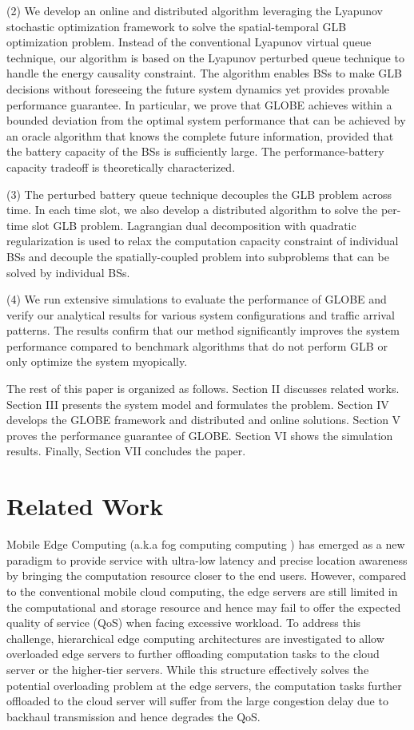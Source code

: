 \documentclass[12pt, draftclsnofoot, letterpaper, onecolumn]{IEEEtran}
\begin{document}
(2) We develop an online and distributed algorithm leveraging the Lyapunov stochastic optimization framework to solve the spatial-temporal GLB optimization problem. Instead of the conventional Lyapunov virtual queue technique, our algorithm is based on the Lyapunov perturbed queue technique to handle the energy causality constraint. The algorithm enables BSs to make GLB decisions without foreseeing the future system dynamics yet provides provable performance guarantee. In particular, we prove that GLOBE achieves within a bounded deviation from the optimal system performance that can be achieved by an oracle algorithm that knows the complete future information, provided that the battery capacity of the BSs is sufficiently large. The performance-battery capacity tradeoff is theoretically characterized.

(3) The perturbed battery queue technique decouples the GLB problem across time. In each time slot, we also develop a distributed algorithm to solve the per-time slot GLB problem. Lagrangian dual decomposition with quadratic regularization is used to relax the computation capacity constraint of individual BSs and decouple the spatially-coupled problem into subproblems that can be solved by individual BSs.

(4) We run extensive simulations to evaluate the performance of GLOBE and verify our analytical results for various system configurations and traffic arrival patterns. The results confirm that our method significantly improves the system performance compared to benchmark algorithms that do not perform GLB or only optimize the system myopically.


The rest of this paper is organized as follows. Section II discusses related works. Section III presents the system model and formulates the problem. Section IV develops the GLOBE framework and distributed and online solutions. Section V proves the performance guarantee of GLOBE. Section VI shows the simulation results. Finally, Section VII concludes the paper.


\section{Related Work}
Mobile Edge Computing \cite{mao2017mobile} (a.k.a fog computing computing \cite{chiang2016fog}) has emerged as a new paradigm to provide service with ultra-low latency and precise location awareness by bringing the computation resource closer to the end users. However, compared to the conventional mobile cloud computing, the edge servers are still limited in the computational and storage resource \cite{mach2017mobile} and hence may fail to offer the expected quality of service (QoS) when facing excessive workload. To address this challenge, hierarchical edge computing architectures \cite{tong2016hierarchical,xu2017online} are investigated to allow overloaded edge servers to further offloading computation tasks to the cloud server or the higher-tier servers. While this structure effectively solves the potential overloading problem at the edge servers, the computation tasks further offloaded to the cloud server will suffer from the large congestion delay due to backhaul transmission and hence degrades the QoS.
\end{document}
